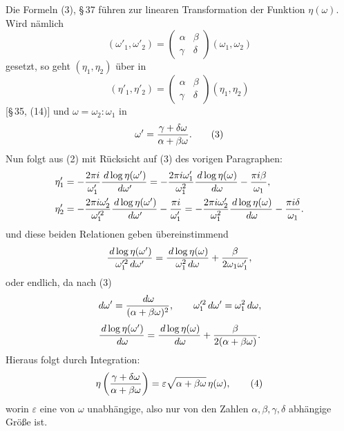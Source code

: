 \documentclass[11pt]{article}
\providecommand{\dd}{\,d}
\begin{document}
Die Formeln (3), \S\,37 führen zur linearen Transformation der Funktion $\eta(\omega)$. Wird nämlich
\begin{equation}
(\omega'_1,\omega'_2)=
\begin{pmatrix}\alpha&\beta\\ \gamma&\delta\end{pmatrix}(\omega_1,\omega_2) 
\tag{1}
\end{equation}
gesetzt, so geht $(\eta_1,\eta_2)$ über in
\begin{equation}
(\eta'_1,\eta'_2)=
\begin{pmatrix}\alpha&\beta\\ \gamma&\delta\end{pmatrix}(\eta_1,\eta_2) 
\tag{2}
\end{equation}
[\S\,35, (14)] und $\omega=\omega_2:\omega_1$ in
\begin{equation}
\omega'={\gamma+\delta\omega\over \alpha+\beta\omega}. 
\tag{3}
\end{equation}
Nun folgt aus (2) mit Rücksicht auf (3) des vorigen Paragraphen:
\begin{align*}
\eta'_1&=-{2\pi i\over \omega'_1}{\dd\log\eta(\omega')\over\dd\omega'}
=-{2\pi i\omega'_1\over\omega_1^2}{\dd\log\eta(\omega)\over\dd\omega}-{\pi i\beta\over\omega_1},\\
\eta'_2&=-{2\pi i\omega'_2\over \omega_1'^2}{\dd\log\eta(\omega')\over\dd\omega'}-{\pi i\over\omega'_1}
=-{2\pi i\omega'_2\over\omega_1^2}{\dd\log\eta(\omega)\over\dd\omega}-{\pi i\delta\over\omega_1}.
\end{align*}
und diese beiden Relationen geben übereinstimmend
\[
 {\dd\log\eta(\omega')\over \omega_1'^2\dd\omega'}
 = {\dd\log\eta(\omega)\over\omega_1^2\dd\omega}
 +{\beta\over2\omega_1\omega_1'},
\]
oder endlich, da nach (3)
\[
\dd\omega'={\dd\omega\over(\alpha+\beta\omega)^2},
\qquad \omega_1'^2\dd\omega'=\omega_1^2\dd\omega,
\]
\[
{\dd\log\eta(\omega')\over\dd\omega}
={\dd\log\eta(\omega)\over\dd\omega}+{\beta\over2(\alpha+\beta\omega)}.
\]
Hieraus folgt durch Integration:
\begin{equation}
\eta\left({\gamma+\delta\omega\over\alpha+\beta\omega}\right)
=\varepsilon\sqrt{\alpha+\beta\omega}\,\eta(\omega),
\tag{4}
\end{equation}
worin $\varepsilon$ eine von $\omega$ unabhängige, also nur von den Zahlen $\alpha,\beta,\gamma,\delta$ abhängige Größe ist.
\end{document}
